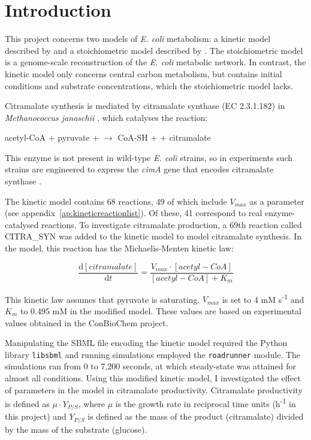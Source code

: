 \documentclass[parskip=full, numbers=noenddot]{scrreprt}
\begin{document}
\chapter*{Introduction}
\label{ch:intro}

This project concerns two models of \emph{E. coli} metabolism: a kinetic model described by \citet{millard_metabolic_2017} and a stoichiometric model described by \citet{orth_comprehensive_2011}.
The stoichiometric model is a genome-scale reconstruction of the \emph{E. coli} metabolic network. In contrast, the kinetic model only concerns central carbon metabolism, but contains initial conditions and substrate concentrations, which the stoichiometric model lacks.

Citramalate synthesis is mediated by citramalate synthase (EC 2.3.1.182) in \emph{Methanococcus janaschii} \citep{wu_production_2016}, which catalyses the reaction:

\begin{center}
  acetyl-CoA + pyruvate +  $\rightarrow$ CoA-SH +  + citramalate
\end{center}

This enzyme is not present in wild-type \emph{E. coli} strains, so in experiments such strains are engineered to express the \emph{cimA} gene that encodes citramalate synthase \citep{wu_production_2016}.

The kinetic model contains 68 reactions, 49 of which include $V_{max}$ as a parameter (see appendix~\ref{ap:kineticreactionlist}). Of these, 41 correspond to real enzyme-catalysed reactions.
To investigate citramalate production, a 69th reaction called CITRA\_SYN was added to the kinetic model to model citramalate synthesis.  In the model, this reaction has the Michaelis-Menten kinetic law:

\[
  \frac{\mathrm{d}[citramalate]}{\mathrm{d}t} = 
  \frac{V_{max} \cdot [acetyl-CoA]}{[acetyl-CoA] + K_{m}}
\]

This kinetic law assumes that pyruvate is saturating. $V_{max}$ is set to 4 mM s\textsuperscript{-1} and $K_{m}$ to 0.495 mM in the modified model. These values are based on experimental values obtained in the ConBioChem project.

Manipulating the SBML file encoding the kinetic model required the Python library \texttt{libsbml} \citep{bornstein_libsbml:_2008} and running simulations employed the \texttt{roadrunner} \citep{somogyi_libroadrunner:_2015} module. The simulations ran from 0 to 7,200 seconds, at which steady-state was attained for almost all conditions.
Using this modified kinetic model, I investigated the effect of parameters in the model in citramalate productivity. Citramalate productivity is defined as $\mu \cdot Y_{P/S}$, where $\mu$ is the growth rate in reciprocal time units (h\textsuperscript{-1} in this project) and $Y_{P/S}$ is defined as the mass of the product (citramalate) divided by the mass of the substrate (glucose).
\end{document}
